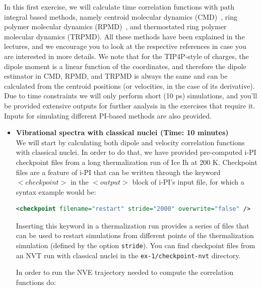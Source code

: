 \documentclass{article}
\begin{document}
\begin{Exercise}[label={realtime},title={Velocity and dipole real time correlation functions}]

In this first exercise, we will calculate time correlation functions with path integral based methods, namely centroid molecular dynamics (CMD)~\cite{cao-voth94jcp}, ring polymer molecular dynamics (RPMD)~\cite{crai-mano04jcp}, and thermostated ring polymer molecular dynamics (TRPMD)\cite{ross+14jcp}. All these methods have been explained in the lectures, and we encourage you to look at the respective references in case you are interested in more details. We note that for the TIP4P-style of charges, the dipole moment is a linear function of the coordinates, and therefore the dipole estimator in CMD, RPMD, and TRPMD is always the same and can be calculated from the centroid positions (or velocities, in the case of its derivative). Due to time constraints we will only perform short (10 ps) simulations, and you'll be provided extensive outputs for further analysis in the exercises that require it. Inputs for simulating different PI-based methods are also provided.

\begin{itemize}

\item \textbf{Vibrational spectra with classical nuclei (Time: 10 minutes)} \\
We will start by calculating both dipole and velocity correlation functions with classical nuclei. In order to do that, we have provided pre-computed i-PI checkpoint files from a long thermalization run of Ice Ih at 200 K. Checkpoint files are a feature of i-PI that can be written through the keyword \lstinxml$<checkpoint>$ in the \lstinxml$<output>$ block of i-PI's input file, for which a syntax example would be:
    
\begin{lstlisting}[language=XML]
<checkpoint filename="restart" stride="2000" overwrite="false" />
\end{lstlisting}

    Inserting this keyword in a thermalization run provides a series of files that can be used to restart simulations from different points of the thermalization simulation (defined by the option \texttt{stride}). You can find checkpoint files from an NVT run with classical nuclei in the \texttt{ex-1/checkpoint-nvt} directory. 
    
    In order to run the NVE trajectory needed to compute the correlation functions do:
    

\end{itemize}
\end{Exercise}
\end{document}
